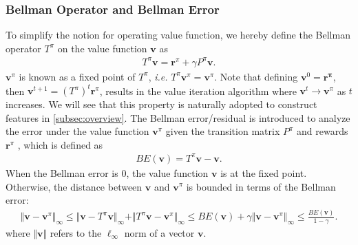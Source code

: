 \documentclass[onecolumn, conference]{IEEEtran}
\begin{document}
\subsubsection{Bellman Operator and  Bellman Error} To simplify the notion for operating value function, we hereby define the Bellman operator $T^\pi$ on the value function $\boldsymbol{v}$ as 
        \begin{align}
            T^\pi\boldsymbol{v} = \boldsymbol{r}^\pi +\gamma P^\pi \boldsymbol{v}.
        \end{align}
		$\boldsymbol{v}^\pi$ is known as a fixed point of $T^\pi$, \textit{i.e.} $T^\pi \boldsymbol{v}^\pi = \boldsymbol{v}^\pi$. Note that defining $ \boldsymbol{v}^0 = \boldsymbol{r^\pi}$, then $\boldsymbol{v}^{t+1} = (T^\pi)^t \boldsymbol{r}^\pi$, results in the value iteration algorithm where $\boldsymbol{v}^t \rightarrow \boldsymbol{v}^\pi$ as $t$ increases. We will see that this property is naturally adopted to construct features in \ref{subsec:overview}. The Bellman error/residual is introduced to analyze the error under the value function $\boldsymbol{v}^{\pi}$ given the transition matrix $P^{\pi}$ and rewards $\boldsymbol{r}^{\pi}$ \cite{Williams1993TightPB}, which is defined as
		\begin{align}
		    BE(\boldsymbol{v}) = T^\pi \boldsymbol{v}  - \boldsymbol{v}.
		\end{align}
		When the Bellman error is 0, the value function $\boldsymbol{v}$ is at the fixed point. Otherwise, the distance between $\boldsymbol{v}$ and $\boldsymbol{v}^\pi$ is bounded in terms of the Bellman error:
		\begin{align}\label{equation:VBE}
			\Vert \boldsymbol{v} - \boldsymbol{v}^\pi \Vert_{\infty} 
			\le  \Vert \boldsymbol{v} - T^\pi \boldsymbol{v}\Vert_{\infty} + \Vert T^\pi\boldsymbol{v} - \boldsymbol{v}^\pi \Vert_{\infty} 
			\le BE(\boldsymbol{v} ) + \gamma \Vert \boldsymbol{v} -  \boldsymbol{v}^\pi\Vert_{\infty}  
			\le \frac{BE(\boldsymbol{v})}{1-\gamma}.
		\end{align}
		where $\Vert \boldsymbol{v} \Vert$ refers to the $\ell_\infty$ norm of a vector $\boldsymbol{v}$.
		
\end{document}
